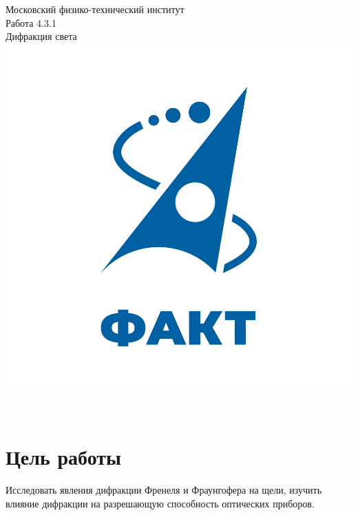 \documentclass[a4paper]{article}
\begin{document}

\begin{titlepage}
\begin{center}
	\large{Московский физико-технический институт}\\
	\vspace{100px}
	\LARGE{Работа 4.3.1}\\
	\LARGE{Дифракция света}\\
	\vspace{30px}
	\includegraphics[scale = 0.3]{fakt_logo.png}\\
\end{center}

\vfill
\begin{flushright}
	\\
\end{flushright}
\end{titlepage}

\newpage

\tableofcontents

\newpage

\section{Цель работы}
Исследовать явления дифракции Френеля и Фраунгофера на щели, изучить влияние дифракции на разрешающую способность оптических приборов.
\end{document}
